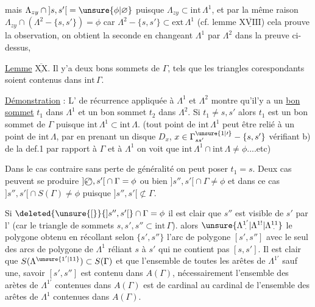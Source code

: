 \margin{ment\qquad $\deleted{\unsure{]}}[s,s']\cap$}
mais $\Lambda_{zy}\cap{]s,s'[}=\unsure{\phi|\varnothing}$ puisque $\Lambda_{zy}\subset\mathrm{int}\,\Lambda^1$, et par la même raison $\Lambda_{zy}\cap(\Lambda^2-\{s,s'\})=\phi$ car $\Lambda^2-\{s,s'\}\subset\mathrm{ext}\,\Lambda^1$ (cf. lemme $\overline{\underline{\mathrm{XVIII}}}$) cela prouve la  observation, on obtient la seconde en changeant $\Lambda^1$ par $\Lambda^2$ dans la preuve ci-dessus, 

\uline{Lemme} $\overline{\underline{\mathrm{XX}}}$. Il y'a deux bons sommets de $\Gamma$,   tels que les  triangles corespondants soient contenus dans $\mathrm{int}\,\Gamma$.

\uline{Démonstration} : L' de récurrence appliquée à $\Lambda^1$ et $\Lambda^2$ montre qu'il'y a un \uline{bon sommet} %
$t_1$ dans $\Lambda^1$ et un bon sommet $t_2$ dans $\Lambda^2$. Si $t_1\ne s,s'$ alors $t_1$ est un bon sommet de $\Gamma$ puisque $\mathrm{int}\,\Lambda^1\subset\mathrm{int}\,\Lambda$. (tout point de $\mathrm{int}\,\Lambda^1$ peut être relié à un point de $\mathrm{int}\,\Lambda$, par  en prenant un disque $D_x$, $x\in\Gamma^{\unsure{1|\prime}}_{ss'}-\{s,s'\}$ vérifiant b) de la def.1 par rapport à $\Gamma$ et à $\Lambda^1$ on voit que $\mathrm{int}\,\Lambda^1\cap\mathrm{int}\,\Lambda\ne\phi$....etc)

Dans le cas contraire sans perte de généralité on peut poser $t_1=s$. Deux cas peuvent se produire $ {]\text{\textcircled{\scriptsize \(s''\)}},s'[}\cap\Gamma=\phi$ ou bien $ {]s'',s'[}\cap\Gamma\ne\phi$ et dans ce cas $ {]s'',s'[}\cap S(\Gamma)\ne\phi$ puisque $ {]s'',s'[}\not\subset\Gamma$.

Si $\deleted{\unsure{[}}{]s'',s'[}\cap\Gamma=\phi$ il est clair que $s''$ est visible de $s'$ par l' (car le triangle de sommets $s,s',s''\subset\mathrm{int}\,\Gamma$).  alors $\unsure{\Lambda^{1'}_{\mkern5mu\cdot}|\Lambda^{1!}|\Lambda^{11}_{\mkern5mu\cdot}}$ le polygone \margin{!}obtenu en récollant selon  $\{s',s''\}$ l'arc de polygone $[s',s'']$ avec le seul des arcs de polygone de $\Lambda^1$ réliant $s$ à $s'$ qui ne contient pas $[s,s']$. Il est clair que $S(\Lambda^{\unsure{1'|11}})\subset S(\Gamma)$ et que l'ensemble de toutes les arêtes de $\Lambda^{1'}$ sauf une, savoir $[s',s'']$ est contenu dans $A(\Gamma)$,  nécessairement l'ensemble des arètes de $\Lambda^{1'}$ contenues dans $A(\Gamma)$ est de cardinal   %
au cardinal de l'ensemble des arêtes de $\Lambda^1$ contenues dans $A(\Gamma)$.

